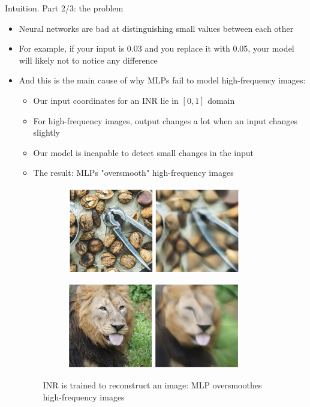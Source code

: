 \documentclass[handout, 10pt]{beamer}
\begin{document}
\begin{frame}{Intuition. Part 2/3: the problem}
\begin{itemize}
    \item\pause Neural networks are bad at distinguishing small values between each other
    \item\pause For example, if your input is 0.03 and you replace it with 0.05, your model will likely not to notice any difference
    \item\pause And this is the main cause of why MLPs fail to model high-frequency images:
    \begin{itemize}
        \item\pause Our input coordinates for an INR lie in $[0,1]$ domain
        \item\pause For high-frequency images, output changes a lot when an input changes slightly
        \item\pause Our model is incapable to detect small changes in the input
        \item\pause The result: MLPs "oversmooth" high-frequency images
    \end{itemize}
    \begin{figure}
        \centering
        \begin{subfigure}{0.45\textwidth}
            \includegraphics[width=0.9\textwidth]{images/mlp-oversmooth-nut}
        \end{subfigure}
        \begin{subfigure}{0.45\textwidth}
            \centering
            \includegraphics[width=0.9\textwidth]{images/mlp-oversmooth-lion}
        \end{subfigure}
        \caption{INR is trained to reconstruct an image: MLP oversmoothes high-frequency images}
    \end{figure}
\end{itemize}
\end{frame}
\end{document}
